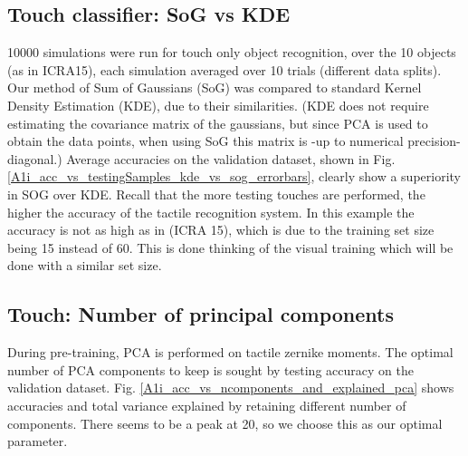\documentclass[]{article}
\begin{document}
\subsection{Touch classifier: SoG vs KDE}

10000 simulations were run for touch only object recognition, over the 10 objects (as in ICRA15), each simulation averaged over 10 trials (different data splits). Our method of Sum of Gaussians (SoG) was compared to standard Kernel Density Estimation (KDE), due to their similarities. (KDE does not require estimating the covariance matrix of the gaussians, but since PCA is used to obtain the data points, when using SoG this matrix is -up to numerical precision- diagonal.) 
Average accuracies on the validation dataset, shown in Fig. \ref{A1i_acc_vs_testingSamples_kde_vs_sog_errorbars}, clearly show a superiority in SOG over KDE.
Recall that the more testing touches are performed, the higher the accuracy of the tactile recognition system. In this example the accuracy is not as high as in (ICRA 15), which is due to the training set size being 15 instead of 60. This is done thinking of the visual training which will be done with a similar set size.

\begin{figure}
	\centering
\end{figure}

\subsection{Touch: Number of principal components}
During pre-training, PCA is performed on tactile zernike moments. The optimal number of PCA components to keep is sought by testing accuracy on the validation dataset.
Fig. \ref{A1i_acc_vs_ncomponents_and_explained_pca} shows accuracies and total variance explained by retaining different number of components. There seems to be a peak at 20, so we choose this as our optimal parameter.

\begin{figure}
	\centering
	\end{figure}
\end{document}
